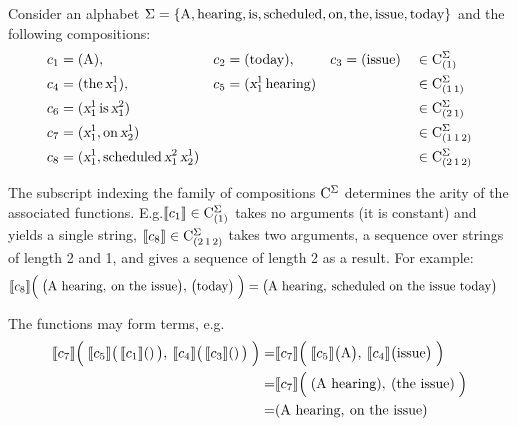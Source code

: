 \documentclass[../document.tex]{subfiles}
\begin{document}
    \begin{example}\label{ex:lcfrs:comp}
       Consider an alphabet \(\Sigma=\{\text{A}, \text{hearing}, \text{is}, \text{scheduled}, \text{on}, \text{the}, \text{issue}, \text{today}\}\) and the following compositions:
        \begin{align*}
            c_1 &= (\text{A}), & c_2 &= (\text{today}), & c_3 &= (\text{issue}) && \in \mathrm{C}^\Sigma_{(1)} \\
            c_4 &= (\text{the} \, \textsl{x}_1^1), & c_5 &= (\textsl{x}_1^1 \, \text{hearing}) & & && \in \mathrm{C}^\Sigma_{(1\,1)} \\
            c_6 &= (\textsl{x}_1^1 \, \text{is} \, \textsl{x}_1^2) && && && \in \mathrm{C}^\Sigma_{(2\,1)} \\
            c_7 &= (\textsl{x}_1^1, \text{on} \, \textsl{x}_2^1) && && && \in \mathrm{C}^\Sigma_{(1\,1\,2)}   \\
            c_8 &= (\textsl{x}_1^1, \text{scheduled} \, \textsl{x}_1^2 \, \textsl{x}_2^1) && && && \in \mathrm{C}^\Sigma_{(2\,1\,2)}
        \end{align*}

        The subscript indexing the family of compositions \(\mathrm{C}^\Sigma\) determines the arity of the associated functions.
        E.g.\@ \(\llbracket c_1\rrbracket \in \mathrm{C}^\Sigma_{(1)}\) takes no arguments (it is constant) and yields a single string,
            \(\llbracket c_8\rrbracket \in \mathrm{C}^\Sigma_{(2\,1\,2)}\) takes two arguments, a sequence over strings of length 2 and 1, and gives a sequence of length 2 as a result.
        For example:
        \begin{align*}
            \llbracket c_8\rrbracket\Big( \; \big( \text{A hearing}, \: \text{on the issue} \big), \, \big( \text{today} \big) \; \Big)
                &= \big( \text{A hearing}, \: \text{scheduled on the issue today} \big)
        \end{align*}

        The functions may form terms, e.g.
        \begin{align*}
            \llbracket c_7\rrbracket\Big( \; \llbracket c_5\rrbracket\big(\,\llbracket c_1\rrbracket()\,\big), \: \llbracket c_4\rrbracket\big(\,\llbracket c_3\rrbracket()\,\big) \; \Big)
                =& \llbracket c_7\rrbracket\Big( \; \llbracket c_5\rrbracket\big(\text{A}\big), \: \llbracket c_4\rrbracket\big(\text{issue}\big) \; \Big) \\
                =& \llbracket c_7\rrbracket\Big( \; (\text{A hearing}), \: (\text{the issue}) \; \Big) \\
                =& (\text{A hearing}, \: \text{on the issue})
        \end{align*}
    \end{example}
\end{document}
